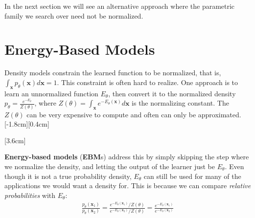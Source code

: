 In the next section we will see an alternative approach where the parametric family we search over need not be normalized.

\section{Energy-Based Models}
Density models constrain the learned function to be normalized, that is, $\int_{\mathbf{x}} p_{\theta}(\mathbf{x})d\mathbf{x} = 1$. This constraint is often hard to realize. One approach is to learn an unnormalized function $E_{\theta}$, then convert it to the normalized density $p_{\theta} = \frac{e^{-E_{\theta}}}{Z(\theta)}$, where $Z(\theta) = \int_{\mathbf{x}} e^{-E_{\theta}(\mathbf{x})}d\mathbf{x}$ is the normalizing constant. The $Z(\theta)$ can be very expensive to compute and often can only be approximated.[-1.8cm][0.4cm]

[3.6cm]

\textbf{Energy-based models} (\textbf{EBM}s) address this by simply skipping the step where we normalize the density, and letting the output of the learner just be $E_\theta$. Even though it is not a true probability density, $E_{\theta}$ can still be used for many of the applications we would want a density for. This is because we can compare \textit{relative probabilities} with $E_\theta$: %
\begin{align}
    \frac{p_\theta(\mathbf{x}_1)}{p_\theta(\mathbf{x}_2)} = \frac{e^{-E_\theta(\mathbf{x}_1)}/Z(\theta)}{e^{-E_\theta(\mathbf{x}_2)}/Z(\theta)}
    = \frac{e^{-E_\theta(\mathbf{x}_1)}}{e^{-E_\theta(\mathbf{x}_2)}}
\end{align}


